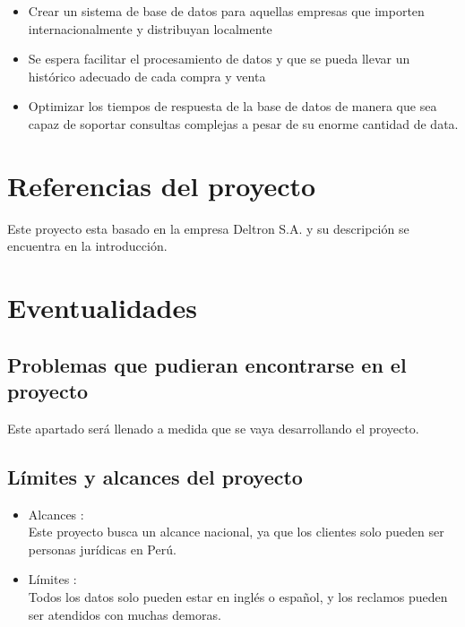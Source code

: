 \documentclass[10pt, a4paper,openany]{report}
\begin{document}
\begin{itemize}
	\item Crear un sistema de base de datos para aquellas empresas que importen internacionalmente y distribuyan localmente
	\item Se espera facilitar el procesamiento de datos y que se pueda llevar un histórico adecuado de cada compra y venta
	\item Optimizar los tiempos de respuesta de la base de datos de manera que sea capaz de soportar
	      consultas complejas a pesar de su enorme cantidad de data.

\end{itemize}

\section{Referencias del proyecto}
\label{sec:Referencias del proyecto}

Este proyecto esta basado en la empresa Deltron S.A. y su descripción se encuentra en la introducción.

\section{Eventualidades}
\label{sec:Eventualidades}

\subsection{Problemas que pudieran encontrarse en el proyecto}
\label{subsec:Problemas que pudieran encontrarse en el proyecto}

Este apartado será llenado a medida que se vaya desarrollando el proyecto.

\subsection{Límites y alcances del proyecto}
\label{subsec:Límites y alcances del proyecto}

\begin{itemize}
	\item Alcances : \\ Este proyecto busca un alcance nacional, ya que los clientes solo pueden ser personas jurídicas en Perú.
	\item Límites : \\ Todos los datos solo pueden estar en inglés o español, y los reclamos pueden ser atendidos con muchas demoras.
\end{itemize}
\end{document}
